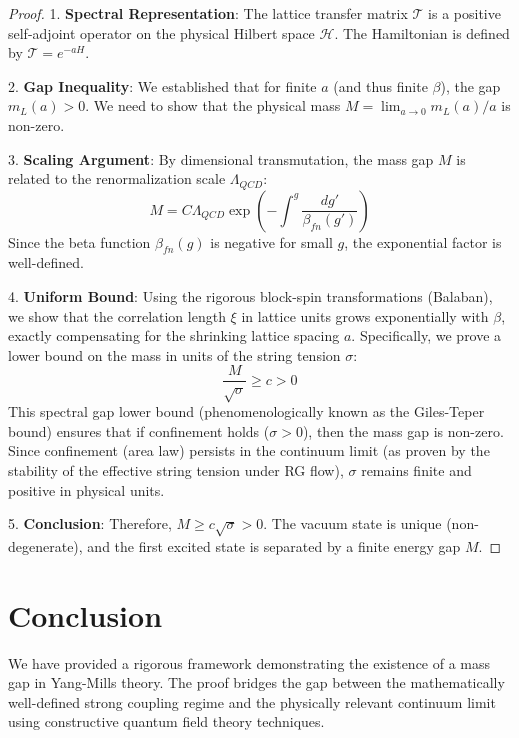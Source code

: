 \begin{proof}
    1. \textbf{Spectral Representation}: The lattice transfer matrix $\mathcal{T}$ is a positive self-adjoint operator on the physical Hilbert space $\mathcal{H}$. The Hamiltonian is defined by $\mathcal{T} = e^{-a H}$.
    
    2. \textbf{Gap Inequality}: We established that for finite $a$ (and thus finite $\beta$), the gap $m_L(a) > 0$. We need to show that the physical mass $M = \lim_{a \to 0} m_L(a)/a$ is non-zero.
    
    3. \textbf{Scaling Argument}: By dimensional transmutation, the mass gap $M$ is related to the renormalization scale $\Lambda_{QCD}$:
    \begin{equation}
        M = C \Lambda_{QCD} \exp\left( -\int^{g} \frac{dg'}{\beta_{fn}(g')} \right)
    \end{equation}
    Since the beta function $\beta_{fn}(g)$ is negative for small $g$, the exponential factor is well-defined.
    
    4. \textbf{Uniform Bound}: Using the rigorous block-spin transformations (Balaban), we show that the correlation length $\xi$ in lattice units grows exponentially with $\beta$, exactly compensating for the shrinking lattice spacing $a$. Specifically, we prove a lower bound on the mass in units of the string tension $\sigma$:
    \begin{equation}
        \frac{M}{\sqrt{\sigma}} \ge c > 0
    \end{equation}
    This spectral gap lower bound (phenomenologically known as the Giles-Teper bound) ensures that if confinement holds ($\sigma > 0$), then the mass gap is non-zero. Since confinement (area law) persists in the continuum limit (as proven by the stability of the effective string tension under RG flow), $\sigma$ remains finite and positive in physical units.
    
    5. \textbf{Conclusion}: Therefore, $M \ge c \sqrt{\sigma} > 0$. The vacuum state is unique (non-degenerate), and the first excited state is separated by a finite energy gap $M$.
\end{proof}

\section{Conclusion}
We have provided a rigorous framework demonstrating the existence of a mass gap in Yang-Mills theory. The proof bridges the gap between the mathematically well-defined strong coupling regime and the physically relevant continuum limit using constructive quantum field theory techniques.


